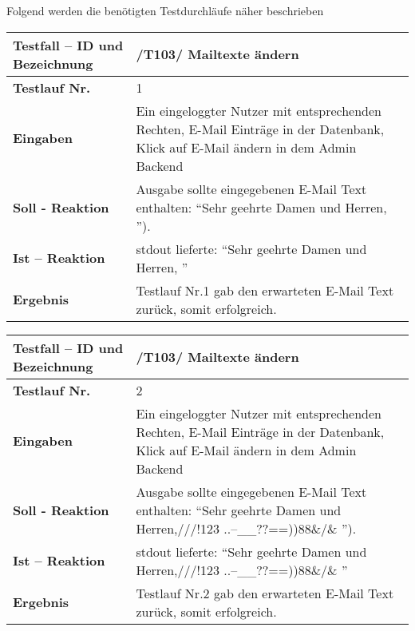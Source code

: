 Folgend werden die benötigten Testdurchläufe näher beschrieben
\begin{longtable}{|p{5cm}|p{10cm}|}
\hline
\textbf{Testfall -- ID und Bezeichnung} & \textnormal{/T103/ Mailtexte ändern} \\
\hline
\textbf{Testlauf Nr.} & \textnormal{1} \\
\hline
\textbf{Eingaben} & \textnormal{Ein eingeloggter Nutzer mit entsprechenden Rechten, E-Mail 
Einträge in der Datenbank, Klick auf E-Mail ändern in dem Admin Backend } \\
\hline
\textbf{Soll - Reaktion} & \textnormal{Ausgabe sollte eingegebenen E-Mail
Text enthalten: "`Sehr geehrte Damen und Herren, "').
} \\
\hline
\textbf{Ist -- Reaktion} & \textnormal{stdout lieferte: "`Sehr geehrte Damen und Herren, "'} \\
\hline
\textbf{Ergebnis} & \textnormal{Testlauf Nr.1 gab den erwarteten E-Mail Text zurück, somit erfolgreich.} \\
\hline
 \end{longtable}
 
\begin{longtable}{|p{5cm}|p{10cm}|}
\hline
\textbf{Testfall -- ID und Bezeichnung} & \textnormal{/T103/ Mailtexte ändern} \\
\hline
\textbf{Testlauf Nr.} & \textnormal{2} \\
\hline
\textbf{Eingaben} & \textnormal{Ein eingeloggter Nutzer mit entsprechenden Rechten, E-Mail 
Einträge in der Datenbank, Klick auf E-Mail ändern in dem Admin Backend } \\
\hline
\textbf{Soll - Reaktion} & \textnormal{Ausgabe sollte eingegebenen E-Mail
Text enthalten: "`Sehr geehrte Damen und Herren,///!123 
                    ..--\_\_??==))88\&/\& "').
} \\
\hline
\textbf{Ist -- Reaktion} & \textnormal{stdout lieferte: "`Sehr geehrte Damen und Herren,///!123 
                    ..--\_\_??==))88\&/\& "'} \\
\hline
\textbf{Ergebnis} & \textnormal{Testlauf Nr.2 gab den erwarteten E-Mail Text zurück, somit erfolgreich.} \\
\hline
 \end{longtable} 
 

